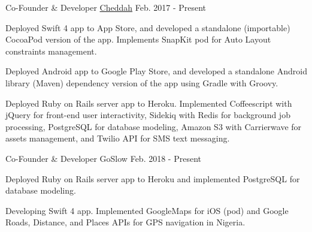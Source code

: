 
\begin{cventries}

  \cventry
    {Co-Founder \& Developer} %
    {\href{http://cheddah.herokuapp.com/}{Cheddah}} %
    {} %
    {Feb. 2017 - Present} %
    {
      \begin{cvitems} %
        \item {Deployed Swift 4 app to App Store, and developed a standalone (importable) CocoaPod version of the app. Implements SnapKit pod for Auto Layout constraints management.}
        \item {Deployed Android app to Google Play Store, and developed a standalone Android library (Maven) dependency version of the app using Gradle with Groovy.}
        \item {Deployed Ruby on Rails server app to Heroku. Implemented Coffeescript with jQuery for front-end user interactivity, Sidekiq with Redis for background job processing, PostgreSQL for database modeling, Amazon S3 with Carrierwave for assets management, and Twilio API for SMS text messaging.}
      \end{cvitems}
    }


  \cventry
    {Co-Founder \& Developer} %
    {GoSlow} %
    {} %
    {Feb. 2018 - Present} %
    {
      \begin{cvitems} %
      	\item {Deployed Ruby on Rails server app to Heroku and implemented PostgreSQL for database modeling.}
        \item {Developing Swift 4 app. Implemented GoogleMaps for iOS (pod) and Google Roads, Distance, and Places APIs for GPS navigation in Nigeria.}
      \end{cvitems}
    }


\end{cventries}